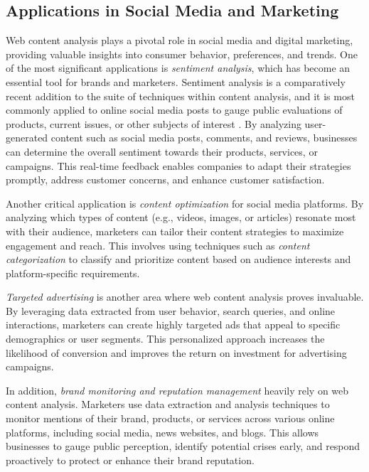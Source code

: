 \subsection{Applications in Social Media and Marketing}
\label{subsec:applications_in_social_media_and_marketing}
Web content analysis plays a pivotal role in social media and digital marketing, providing valuable insights into consumer behavior, preferences, and trends.
One of the most significant applications is \textit{sentiment analysis}, which has become an essential tool for brands and marketers.
Sentiment analysis is a comparatively recent addition to the suite of techniques within content analysis, and it is most commonly applied to online social media posts to gauge public evaluations of products, current issues, or other subjects of interest \cite[page 414]{the_content_analysis_guidebook}.
By analyzing user-generated content such as social media posts, comments, and reviews, businesses can determine the overall sentiment towards their products, services, or campaigns.
This real-time feedback enables companies to adapt their strategies promptly, address customer concerns, and enhance customer satisfaction.

Another critical application is \textit{content optimization} for social media platforms.
By analyzing which types of content (e.g., videos, images, or articles) resonate most with their audience, marketers can tailor their content strategies to maximize engagement and reach.
This involves using techniques such as \textit{content categorization} to classify and prioritize content based on audience interests and platform-specific requirements.

\textit{Targeted advertising} is another area where web content analysis proves invaluable.
By leveraging data extracted from user behavior, search queries, and online interactions, marketers can create highly targeted ads that appeal to specific demographics or user segments.
This personalized approach increases the likelihood of conversion and improves the return on investment for advertising campaigns.

In addition, \textit{brand monitoring and reputation management} heavily rely on web content analysis.
Marketers use data extraction and analysis techniques to monitor mentions of their brand, products, or services across various online platforms, including social media, news websites, and blogs.
This allows businesses to gauge public perception, identify potential crises early, and respond proactively to protect or enhance their brand reputation.

